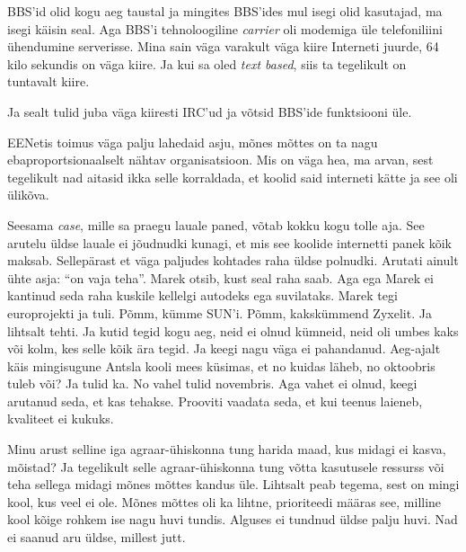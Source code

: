 
BBS'id olid kogu aeg taustal ja mingites BBS'ides mul isegi olid kasutajad, ma 
isegi käisin seal. Aga BBS'i tehnoloogiline \emph{carrier} oli  modemiga  üle 
telefoniliini ühendumine serverisse. Mina sain väga varakult väga kiire 
Interneti juurde, 64 kilo sekundis on väga kiire. Ja kui sa oled \emph{text 
based}, siis ta tegelikult on  tuntavalt kiire. 

Ja sealt tulid juba väga kiiresti IRC'ud ja võtsid BBS'ide funktsiooni üle. 

EENetis toimus väga palju lahedaid asju, mõnes mõttes on ta nagu 
ebaproportsionaalselt nähtav organisatsioon. Mis on  väga hea, ma arvan, sest 
tegelikult nad aitasid ikka selle korraldada, et koolid said interneti kätte ja 
see oli ülikõva.


Seesama \emph{case}, mille sa praegu lauale paned, võtab kokku kogu tolle aja. 
See arutelu üldse lauale ei  jõudnudki kunagi, et mis see koolide internetti 
panek kõik maksab. Sellepärast et väga paljudes kohtades raha  üldse polnudki. 
Arutati ainult ühte asja: \enquote{on vaja teha}. Marek otsib, kust seal raha saab. Aga ega Marek ei kantinud seda raha kuskile 
kellelgi autodeks ega suvilataks. Marek tegi  europrojekti ja tuli. Põmm, kümme 
SUN'i. Põmm, kakskümmend Zyxelit. Ja lihtsalt tehti. Ja kutid tegid kogu aeg, 
neid ei olnud kümneid, neid oli umbes kaks või kolm, kes selle kõik ära tegid. 
Ja keegi nagu väga ei pahandanud. Aeg-ajalt käis mingisugune  Antsla kooli mees 
küsimas, et no kuidas läheb, no oktoobris tuleb või? Ja tulid ka. No vahel 
tulid novembris. Aga vahet ei olnud, keegi arutanud seda, et kas tehakse. 
Prooviti vaadata seda, et kui teenus laieneb,  kvaliteet ei kukuks. 


Minu arust selline iga agraar-ühiskonna tung harida maad, kus midagi ei kasva, 
mõistad? Ja tegelikult selle agraar-ühiskonna tung võtta kasutusele ressurss 
või teha sellega midagi mõnes mõttes kandus üle. Lihtsalt peab tegema, sest  on 
 mingi kool, kus veel ei ole. Mõnes mõttes oli ka lihtne, prioriteedi määras 
see, milline kool kõige rohkem ise nagu huvi tundis. Alguses ei tundnud üldse 
palju huvi. Nad ei saanud aru üldse, millest jutt.

